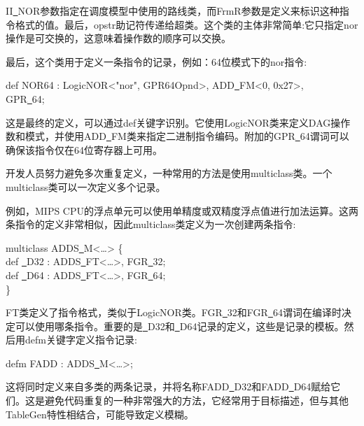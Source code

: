 II\underline{~}NOR参数指定在调度模型中使用的路线类，而FrmR参数是定义来标识这种指令格式的值。最后，opstr助记符传递给超类。这个类的主体非常简单:它只指定nor操作是可交换的，这意味着操作数的顺序可以交换。\par

最后，这个类用于定义一条指令的记录，例如：64位模式下的nor指令:\par

\begin{tcolorbox}[colback=white,colframe=black]
def NOR64 : LogicNOR<"nor", GPR64Opnd>, ADD\underline{~}FM<0, 0x27>,  \\
\hspace*{6cm}GPR\underline{~}64;
\end{tcolorbox}

这是最终的定义，可以通过def关键字识别。它使用LogicNOR类来定义DAG操作数和模式，并使用ADD\underline{~}FM类来指定二进制指令编码。附加的GPR\underline{~}64谓词可以确保该指令仅在64位寄存器上可用。\par

开发人员努力避免多次重复定义，一种常用的方法是使用multiclass类。一个multiclass类可以一次定义多个记录。\par

例如，MIPS CPU的浮点单元可以使用单精度或双精度浮点值进行加法运算。这两条指令的定义非常相似，因此multiclass类定义为一次创建两条指令:\par

\begin{tcolorbox}[colback=white,colframe=black]
multiclass ADDS\underline{~}M<…> \{ \\
\hspace*{1cm}def \underline{~}D32 : ADDS\underline{~}FT<…>, FGR\underline{~}32; \\
\hspace*{1cm}def \underline{~}D64 : ADDS\underline{~}FT<…>, FGR\underline{~}64; \\
\}
\end{tcolorbox}

FT类定义了指令格式，类似于LogicNOR类。FGR\underline{~}32和FGR\underline{~}64谓词在编译时决定可以使用哪条指令。重要的是\underline{~}D32和\underline{~}D64记录的定义，这些是记录的模板。然后用defm关键字定义指令记录:\par

\begin{tcolorbox}[colback=white,colframe=black]
defm FADD : ADDS\underline{~}M<…>;
\end{tcolorbox}

这将同时定义来自多类的两条记录，并将名称FADD\underline{~}D32和FADD\underline{~}D64赋给它们。这是避免代码重复的一种非常强大的方法，它经常用于目标描述，但与其他TableGen特性相结合，可能导致定义模糊。\par

